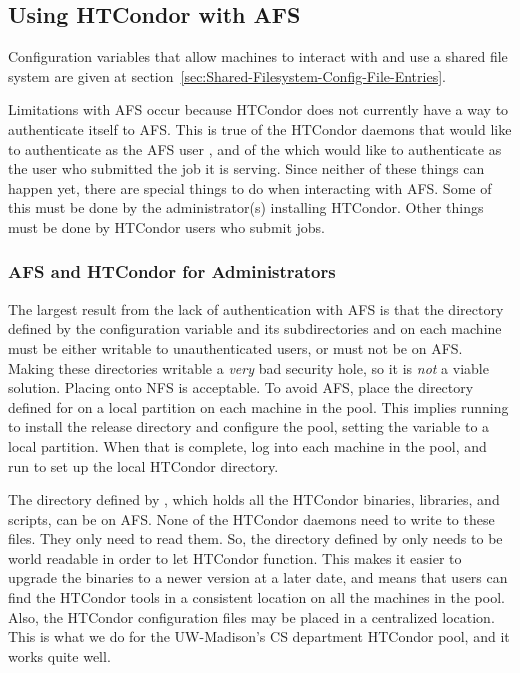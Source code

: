 \subsection{\label{sec:HTCondor-AFS}Using HTCondor with AFS}

Configuration variables that allow machines to interact with and
use a shared file system are given at
section~\ref{sec:Shared-Filesystem-Config-File-Entries}.

Limitations with AFS occur because
 HTCondor does not currently have a way to authenticate itself to AFS.
This is true of the HTCondor daemons that would like to authenticate as
the AFS user , and of the  which would like to
authenticate as the user who submitted the job it is serving.
Since neither of these things can happen yet, there are special
things to do when interacting with AFS.
Some of this must be done by the administrator(s) installing HTCondor.
Other things must be done by HTCondor users who submit jobs.

\subsubsection{\label{sec:HTCondor-AFS-Admin}AFS and HTCondor for Administrators}

The largest result from the lack of authentication with AFS is that
the directory defined by the configuration variable 
and its subdirectories  and  on each machine
must be either writable to unauthenticated users, or must not be on AFS.
Making these directories writable a \emph{very} bad security hole,
so it is \emph{not} a viable solution.
Placing  onto NFS is acceptable.
To avoid AFS, place the directory defined for  on
a local partition on each machine in the pool.
This implies running  to install the release directory and
configure the pool,
setting the  variable to a local partition.
When that is complete, log into each machine in the pool,
and run  to set up the local HTCondor directory.

The directory defined by ,
which holds all the HTCondor binaries,
libraries, and scripts, can be on AFS.
None of the HTCondor daemons need to write to these files.
They only need to read them.
So, the directory defined by  only needs to be
world readable in order to let HTCondor function.
This makes it easier to
upgrade the binaries to a newer version at a later date,
and means that users can find the HTCondor tools in a consistent location
on all the machines in the pool. 
Also, the HTCondor configuration files may be placed in a centralized location.
This is what we do for the UW-Madison's CS department HTCondor pool,
and it works quite well.


